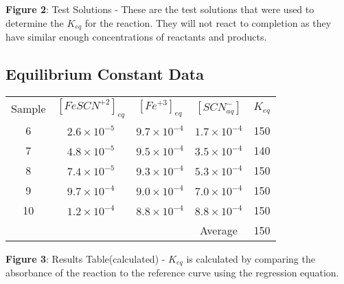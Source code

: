 \documentclass{article}
\begin{document}
\centering
\textbf{Figure 2}: Test Solutions - These are the test solutions that were used to determine the $K_{eq}$ for the reaction. They will not react to completion as they have similar enough concentrations of reactants and products.
$\ $
\newpage 
\subsection{Equilibrium Constant Data}
\begin{table}[h!]
    \centering
        \begin{tabular}{c|c|c|c|c}
            Sample & $[FeSCN^{+2}]_{eq}$ & $[Fe^{+3}]_{eq}$ & $[SCN^-_{aq}]$ & $K_{eq}$ \\
            6 & $2.6\times 10^{-5}$ & $9.7\times 10^{-4}$ & $1.7\times10^{-4}$ & 150 \\
            7 & $4.8\times 10^{-5}$ & $9.5\times 10^{-4}$ & $3.5\times10^{-4}$ & 140 \\
            8 & $7.4\times 10^{-5}$ & $9.3\times 10^{-4}$ & $5.3\times10^{-4}$ & 150 \\
            9 & $9.7\times 10^{-4}$ & $9.0\times 10^{-4}$ & $7.0\times10^{-4}$ & 150 \\
            10 & $1.2\times 10^{-4}$ & $8.8\times 10^{-4}$ & $8.8\times 10^{-4}$ & 150\\
            & & &Average&150
        \end{tabular}
    \end{table}

\centering

\textbf{Figure 3}: Results Table(calculated) - $K_{eq}$ is calculated by comparing the absorbance of the reaction to the reference curve using the regression equation.
$\ $

$\ $ 
\end{document}

